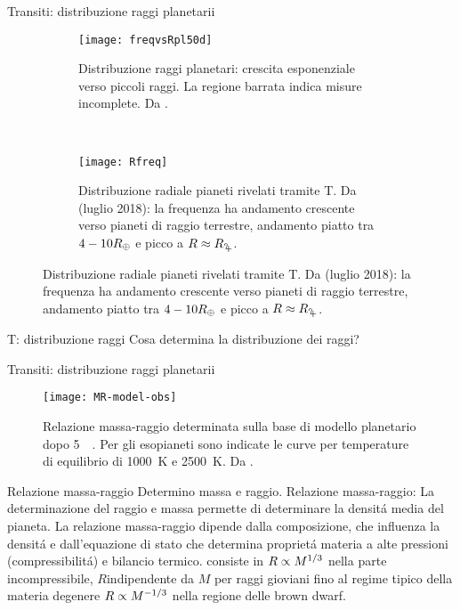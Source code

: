 \begin{frame}{Transiti: distribuzione raggi planetarii}
\begin{figure}[!ht]
	\begin{subfigure}[b]{0.47\textwidth}
		\centering
		\texttt{[image: freqvsRpl50d]}
		\caption{Distribuzione raggi planetari: crescita esponenziale verso piccoli raggi. La regione barrata indica misure incomplete. Da \cite{howard2012planet}.}\label{fig:howard2012planet}
	\end{subfigure}
	~
	\begin{subfigure}[b]{0.49\textwidth} \centering\texttt{[image: Rfreq]}\caption{Distribuzione radiale pianeti rivelati tramite T. Da \cite{exoplanet.eu} (luglio 2018): la frequenza ha andamento crescente verso pianeti di raggio terrestre, andamento piatto tra $4-10R_{\oplus}{}$ e picco a $R\approx\rjupiter{}$.}\label{fig:Rfreq}
	\end{subfigure}
\end{figure}
\end{frame}

\begin{wordonframe}{T: distribuzione raggi}
Cosa determina la distribuzione dei raggi?

\end{wordonframe}

\begin{frame}{Transiti: distribuzione raggi planetarii}
\begin{figure}[!ht]
	\centering \texttt{[image: MR-model-obs]}
	\caption{Relazione massa-raggio determinata sulla base di modello planetario dopo \SI{5}{\giga\year}. Per gli esopianeti sono indicate le curve per temperature di equilibrio di \SI{1000}{\kelvin} e \SI{2500}{\kelvin}. Da \cite{guillot2014giant}.}\label{fig:MR-model-obs}
\end{figure}
\end{frame}

\begin{wordonframe}{Relazione massa-raggio}
Determino massa e raggio.
Relazione massa-raggio: 
La determinazione del raggio e massa permette di determinare la densit\'a media del pianeta.
La relazione massa-raggio dipende dalla composizione, che influenza la densit\'a e dall'equazione di stato che determina propriet\'a materia a alte pressioni (compressibilit\'a) e bilancio termico.
consiste in $R\propto M^{1/3}$ nella parte incompressibile, $R$indipendente da $M$ per raggi gioviani fino al regime tipico della materia degenere $R\propto M^{-1/3}$ nella regione delle brown dwarf.
\end{wordonframe}